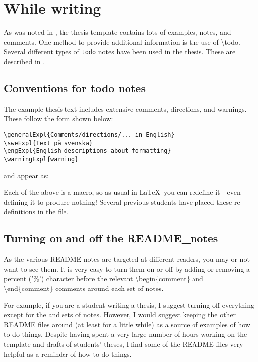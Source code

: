 \section{While writing}
As was noted in , the thesis template contains lots of examples, notes, and comments. One method to provide additional information is the use of \textbackslash todo. Several different types of \texttt{todo} notes have been used in the thesis. These are described in .

\subsection{Conventions for todo notes}
\label{sec:todonotes}
The example thesis text includes extensive comments, directions, and warnings. These follow the form shown below:
\begin{lstlisting}
\generalExpl{Comments/directions/... in English}
\sweExpl{Text på svenska}
\engExpl{English descriptions about formatting}
\warningExpl{warning}  
\end{lstlisting}
and appear as:

Each of the above is a macro, so as usual in \LaTeX\ you can redefine it - even defining it to produce nothing! Several previous students have placed these re-definitions in the  file.

\subsection{Turning on and off the README\_notes}
As the various README notes are targeted at different readers, you may or not want to see them. It is very easy to turn them on or off by adding or removing a percent ('\%') character before the relevant \textbackslash begin\{comment\} and \textbackslash end\{comment\} comments around each set of notes.

For example, if you are a student writing a thesis, I suggest turning off everything except for the  and  sets of notes. However, I would suggest keeping the other README files around (at least for a little while) as a source of examples of how to do things. Despite having spent a very large number of hours working on the template and drafts of students' theses, I find some of the README files very helpful as a reminder of how to do things.

